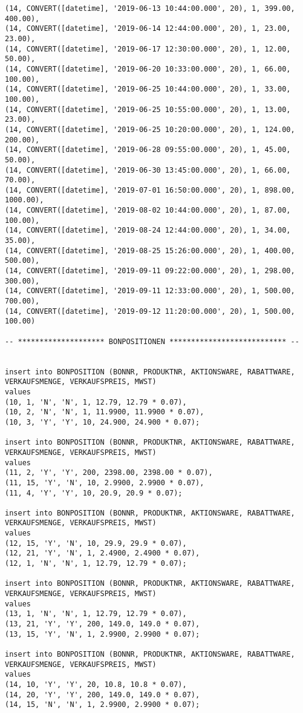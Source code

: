 \begin{lstlisting}
(14, CONVERT([datetime], '2019-06-13 10:44:00.000', 20), 1, 399.00, 400.00),
(14, CONVERT([datetime], '2019-06-14 12:44:00.000', 20), 1, 23.00, 23.00),
(14, CONVERT([datetime], '2019-06-17 12:30:00.000', 20), 1, 12.00, 50.00),
(14, CONVERT([datetime], '2019-06-20 10:33:00.000', 20), 1, 66.00, 100.00),
(14, CONVERT([datetime], '2019-06-25 10:44:00.000', 20), 1, 33.00, 100.00),
(14, CONVERT([datetime], '2019-06-25 10:55:00.000', 20), 1, 13.00, 23.00),
(14, CONVERT([datetime], '2019-06-25 10:20:00.000', 20), 1, 124.00, 200.00),
(14, CONVERT([datetime], '2019-06-28 09:55:00.000', 20), 1, 45.00, 50.00),
(14, CONVERT([datetime], '2019-06-30 13:45:00.000', 20), 1, 66.00, 70.00),
(14, CONVERT([datetime], '2019-07-01 16:50:00.000', 20), 1, 898.00, 1000.00),
(14, CONVERT([datetime], '2019-08-02 10:44:00.000', 20), 1, 87.00, 100.00),
(14, CONVERT([datetime], '2019-08-24 12:44:00.000', 20), 1, 34.00, 35.00),
(14, CONVERT([datetime], '2019-08-25 15:26:00.000', 20), 1, 400.00, 500.00),
(14, CONVERT([datetime], '2019-09-11 09:22:00.000', 20), 1, 298.00, 300.00),
(14, CONVERT([datetime], '2019-09-11 12:33:00.000', 20), 1, 500.00, 700.00),
(14, CONVERT([datetime], '2019-09-12 11:20:00.000', 20), 1, 500.00, 100.00)

-- ******************** BONPOSITIONEN *************************** --


insert into BONPOSITION (BONNR, PRODUKTNR, AKTIONSWARE, RABATTWARE, VERKAUFSMENGE, VERKAUFSPREIS, MWST)
values
(10, 1, 'N', 'N', 1, 12.79, 12.79 * 0.07),
(10, 2, 'N', 'N', 1, 11.9900, 11.9900 * 0.07),
(10, 3, 'Y', 'Y', 10, 24.900, 24.900 * 0.07);

insert into BONPOSITION (BONNR, PRODUKTNR, AKTIONSWARE, RABATTWARE, VERKAUFSMENGE, VERKAUFSPREIS, MWST)
values
(11, 2, 'Y', 'Y', 200, 2398.00, 2398.00 * 0.07),
(11, 15, 'Y', 'N', 10, 2.9900, 2.9900 * 0.07),
(11, 4, 'Y', 'Y', 10, 20.9, 20.9 * 0.07);

insert into BONPOSITION (BONNR, PRODUKTNR, AKTIONSWARE, RABATTWARE, VERKAUFSMENGE, VERKAUFSPREIS, MWST)
values
(12, 15, 'Y', 'N', 10, 29.9, 29.9 * 0.07),
(12, 21, 'Y', 'N', 1, 2.4900, 2.4900 * 0.07),
(12, 1, 'N', 'N', 1, 12.79, 12.79 * 0.07);

insert into BONPOSITION (BONNR, PRODUKTNR, AKTIONSWARE, RABATTWARE, VERKAUFSMENGE, VERKAUFSPREIS, MWST)
values
(13, 1, 'N', 'N', 1, 12.79, 12.79 * 0.07),
(13, 21, 'Y', 'Y', 200, 149.0, 149.0 * 0.07),
(13, 15, 'Y', 'N', 1, 2.9900, 2.9900 * 0.07);

insert into BONPOSITION (BONNR, PRODUKTNR, AKTIONSWARE, RABATTWARE, VERKAUFSMENGE, VERKAUFSPREIS, MWST)
values
(14, 10, 'Y', 'Y', 20, 10.8, 10.8 * 0.07),
(14, 20, 'Y', 'Y', 200, 149.0, 149.0 * 0.07),
(14, 15, 'N', 'N', 1, 2.9900, 2.9900 * 0.07);


\end{lstlisting}
